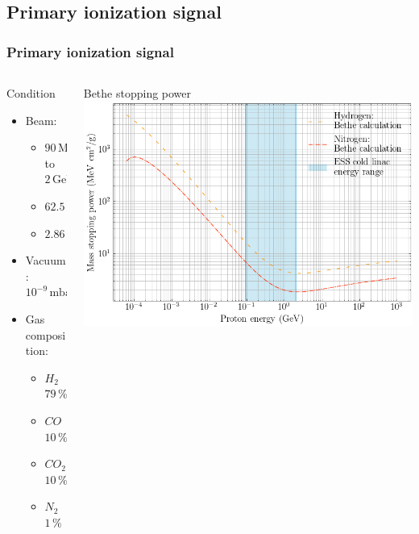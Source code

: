 \subsection{Primary ionization signal}
\begin{frame}
  \frametitle{Primary ionization signal}
  \begin{columns}
    \begin{column}{0.35\textwidth}
      \begin{block}{Condition}
        \begin{itemize}
          \item Beam:
                \begin{itemize}
                  \item $90\,\mathrm{MeV}$ to $2\,\mathrm{GeV}$
                  \item $62.5\,\mathrm{mA}$
                  \item $2.86\,\mathrm{ms}$
                \end{itemize}
          \item Vacuum: $10^{-9}\,\mathrm{mbar}$
          \item Gas composition:
                \begin{itemize}
                  \item $H_2$ $79\,\%$
                  \item $CO$ $10\,\%$
                  \item $CO_2$ $10\,\%$
                  \item $N_2$ $1\,\%$
                \end{itemize}
        \end{itemize}
      \end{block}
    \end{column}
    \begin{column}{0.60\textwidth}
      \centering
      Bethe stopping power
      \includegraphics[width=\textwidth]{03_SIM/fig/fig000_bethe.pdf}
    \end{column}
  \end{columns}
\end{frame}

